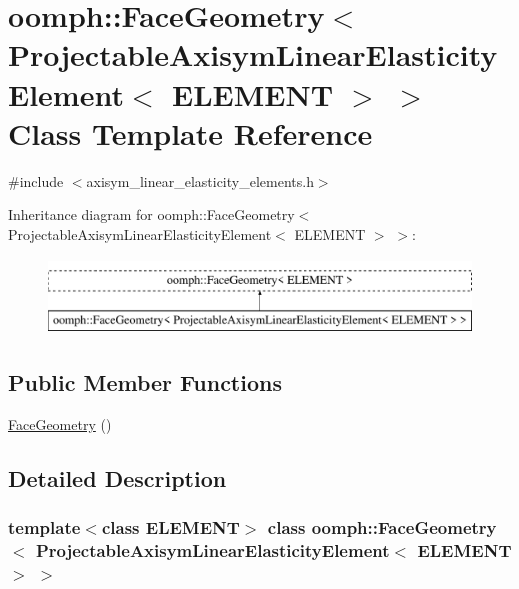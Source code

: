 \hypertarget{classoomph_1_1FaceGeometry_3_01ProjectableAxisymLinearElasticityElement_3_01ELEMENT_01_4_01_4}{}\section{oomph\+:\+:Face\+Geometry$<$ Projectable\+Axisym\+Linear\+Elasticity\+Element$<$ E\+L\+E\+M\+E\+NT $>$ $>$ Class Template Reference}
\label{classoomph_1_1FaceGeometry_3_01ProjectableAxisymLinearElasticityElement_3_01ELEMENT_01_4_01_4}


{\ttfamily \#include $<$axisym\+\_\+linear\+\_\+elasticity\+\_\+elements.\+h$>$}

Inheritance diagram for oomph\+:\+:Face\+Geometry$<$ Projectable\+Axisym\+Linear\+Elasticity\+Element$<$ E\+L\+E\+M\+E\+NT $>$ $>$\+:\begin{figure}[H]
\begin{center}
\leavevmode
\includegraphics[height=2.000000cm]{classoomph_1_1FaceGeometry_3_01ProjectableAxisymLinearElasticityElement_3_01ELEMENT_01_4_01_4}
\end{center}
\end{figure}
\subsection*{Public Member Functions}
\begin{DoxyCompactItemize}
\item 
\hyperlink{classoomph_1_1FaceGeometry_3_01ProjectableAxisymLinearElasticityElement_3_01ELEMENT_01_4_01_4_ac822b4f3ff1ed252ba798eaa3bf0de89}{Face\+Geometry} ()
\end{DoxyCompactItemize}


\subsection{Detailed Description}
\subsubsection*{template$<$class E\+L\+E\+M\+E\+NT$>$\newline
class oomph\+::\+Face\+Geometry$<$ Projectable\+Axisym\+Linear\+Elasticity\+Element$<$ E\+L\+E\+M\+E\+N\+T $>$ $>$}

